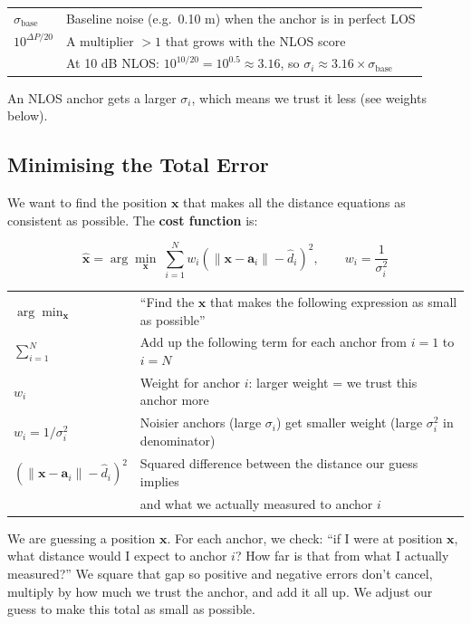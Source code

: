 \documentclass[11pt,a4paper]{article}
\newcommand{\vect}[1]{\bm{#1}}
\begin{document}
\begin{symbols}
\begin{tabular}{ll}
$\sigma_{\text{base}}$ & Baseline noise (e.g.\ 0.10 m) when the anchor is in perfect LOS \\
$10^{\Delta P/20}$ & A multiplier $> 1$ that grows with the NLOS score \\
                   & At 10 dB NLOS: $10^{10/20} = 10^{0.5} \approx 3.16$, so $\sigma_i \approx 3.16 \times \sigma_{\text{base}}$ \\
\end{tabular}
\end{symbols}

An NLOS anchor gets a larger $\sigma_i$, which means we trust it less (see weights below).

\subsection{Minimising the Total Error}

We want to find the position $\vect{x}$ that makes all the distance equations as consistent as possible. The \textbf{cost function} is:

\begin{equation}
\hat{\vect{x}} = \arg\min_{\vect{x}}\; \sum_{i=1}^{N} w_i \left(\|\vect{x} - \vect{a}_i\| - \hat{d}_i\right)^2, \qquad w_i = \frac{1}{\sigma_i^2}
\label{eq:wls}
\end{equation}

\begin{symbols}
\begin{tabular}{ll}
$\arg\min_{\vect{x}}$ & ``Find the $\vect{x}$ that makes the following expression as small as possible'' \\
$\sum_{i=1}^{N}$ & Add up the following term for each anchor from $i=1$ to $i=N$ \\
$w_i$ & Weight for anchor $i$: larger weight = we trust this anchor more \\
$w_i = 1/\sigma_i^2$ & Noisier anchors (large $\sigma_i$) get smaller weight (large $\sigma_i^2$ in denominator) \\
$(\|\vect{x}-\vect{a}_i\| - \hat{d}_i)^2$ & Squared difference between the distance our guess implies \\
  & and what we actually measured to anchor $i$ \\
\end{tabular}
\end{symbols}

\begin{plain}
We are guessing a position $\vect{x}$. For each anchor, we check: ``if I were at position $\vect{x}$, what distance would I expect to anchor $i$? How far is that from what I actually measured?'' We square that gap so positive and negative errors don't cancel, multiply by how much we trust the anchor, and add it all up. We adjust our guess to make this total as small as possible.
\end{plain}
\end{document}
